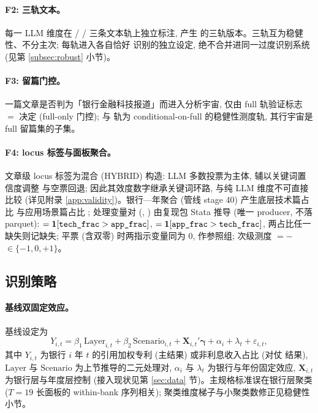 \paragraph{F2: 三轨文本。}
每一 LLM 维度在  /  /  三条文本轨上独立标注, 产生
 的三轨版本。三轨互为稳健性、不分主次; 每轨进入各自恰好
识别的独立设定, 绝不合并进同一过度识别系统 (见第 \ref{subsec:robust} 小节)。

\paragraph{F3: 留篇门控。}
一篇文章是否判为「银行金融科技报道」而进入分析宇宙, 仅由 full 轨验证标志
$=$ 决定 (full-only 门控);  与
 轨为 conditional-on-full 的稳健性测度轨, 其行宇宙是 full 留篇集的子集。

\paragraph{F4: locus 标签与面板聚合。}
文章级 locus 标签为混合 (HYBRID) 构造: LLM 多数投票为主体, 辅以关键词置信度调整
与空票回退; 因此其效度数字继承关键词环路, 与纯 LLM 维度不可直接比较 (详见附录
\ref{app:validity})。银行—年聚合 (管线 stage 40) 产生底层技术篇占比
 与应用场景篇占比 ; 处理变量对
(, ) 由复现包 Stata
 推导 (唯一 producer, 不落 parquet):
$=\mathbf{1}[\texttt{tech\_frac}>\texttt{app\_frac}]$,
$=\mathbf{1}[\texttt{app\_frac}>\texttt{tech\_frac}]$,
两占比任一缺失则记缺失; 平票 (含双零) 时两指示变量同为 0, 作参照组; 次级测度
$=$$-$
$\in\{-1,0,+1\}$。

\subsection{识别策略}

\paragraph{基线双固定效应。}
基线设定为
\begin{equation}\label{eq:baseline}
Y_{i,t} = \beta_1\,\mathrm{Layer}_{i,t} + \beta_2\,\mathrm{Scenario}_{i,t}
 + \mathbf{X}_{i,t}'\boldsymbol{\gamma} + \alpha_i + \lambda_t + \varepsilon_{i,t},
\end{equation}
其中 $Y_{i,t}$ 为银行 $i$ 年 $t$ 的引用加权专利 (主结果) 或非利息收入占比 (对仗
结果), $\mathrm{Layer}$ 与 $\mathrm{Scenario}$ 为上节推导的二元处理对, $\alpha_i$
与 $\lambda_t$ 为银行与年份固定效应, $\mathbf{X}_{i,t}$ 为银行层与年度层控制
(接入现状见第 \ref{sec:data} 节)。主规格标准误在银行层聚类 ($T=19$ 长面板的
within-bank 序列相关); 聚类维度梯子与小聚类数修正见稳健性小节。

